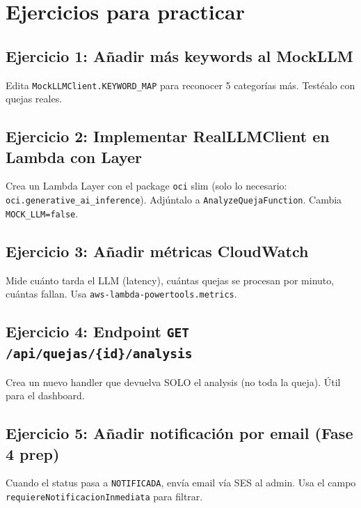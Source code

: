 \documentclass[11pt,a4paper,oneside]{article}
\begin{document}
\section{Ejercicios para practicar}

\subsection{Ejercicio 1: A\~nadir m\'as keywords al MockLLM}

Edita \texttt{MockLLMClient.KEYWORD\_MAP} para reconocer 5 categor\'ias m\'as. Test\'ealo con quejas reales.

\subsection{Ejercicio 2: Implementar RealLLMClient en Lambda con Layer}

Crea un Lambda Layer con el package \texttt{oci} slim (solo lo necesario: \texttt{oci.generative\_ai\_inference}). Adj\'untalo a \texttt{AnalyzeQuejaFunction}. Cambia \texttt{MOCK\_LLM=false}.

\subsection{Ejercicio 3: A\~nadir m\'etricas CloudWatch}

Mide cu\'anto tarda el LLM (latency), cu\'antas quejas se procesan por minuto, cu\'antas fallan. Usa \texttt{aws-lambda-powertools.metrics}.

\subsection{Ejercicio 4: Endpoint \texttt{GET /api/quejas/\{id\}/analysis}}

Crea un nuevo handler que devuelva SOLO el analysis (no toda la queja). \'Util para el dashboard.

\subsection{Ejercicio 5: A\~nadir notificaci\'on por email (Fase 4 prep)}

Cuando el status pasa a \texttt{NOTIFICADA}, env\'ia email v\'ia SES al admin. Usa el campo \texttt{requiereNotificacionInmediata} para filtrar.

\end{document}

